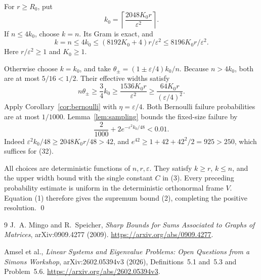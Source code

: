 \documentclass[11pt]{article}
\theoremstyle{definition}
\begin{document}
For \(r\ge R_0\), put
\[
                    k_0=\left\lceil
                            \frac{2048K_0r}{\varepsilon^2}
                          \right\rceil.                         \tag{29}
\]
If \(n\le4k_0\), choose \(k=n\). Its Gram is exact, and
\[
 k=n\le4k_0\le(8192K_0+4)r/\varepsilon^2
                         \le8196K_0r/\varepsilon^2.             \tag{30}
\]
Here \(r/\varepsilon^2\ge1\) and \(K_0\ge1\).

Otherwise choose \(k=k_0\), and take
\(\theta_\pm=(1\pm\varepsilon/4)k_0/n\).
Because \(n>4k_0\), both are at most \(5/16<1/2\).
Their effective widths satisfy
\[
 n\theta_\pm\ge\frac34 k_0
 \ge\frac{1536K_0r}{\varepsilon^2}
 \ge\frac{64K_0r}{(\varepsilon/4)^2}.                             \tag{31}
\]
Apply Corollary~\ref{cor:bernoulli} with \(\eta=\varepsilon/4\).
Both Bernoulli failure probabilities are at most \(1/1000\).
Lemma~\ref{lem:sampling} bounds the fixed-size failure by
\[
             \frac2{1000}+2e^{-\varepsilon^2k_0/48}<0.01.        \tag{32}
\]
Indeed \(\varepsilon^2k_0/48\ge2048K_0r/48>42\), and
\(e^{42}\ge1+42+42^2/2=925>250\), which suffices for (32).

All choices are deterministic functions of \(n,r,\varepsilon\).
They satisfy \(k\ge r\), \(k\le n\), and the upper width bound with
the single constant \(C\) in (3). Every preceding probability estimate
is uniform in the deterministic orthonormal frame \(V\).
Equation (1) therefore gives the supremum bound (2), completing
the positive resolution. \qed

\begin{thebibliography}{9}
J.~A. Mingo and R.~Speicher,
\emph{Sharp Bounds for Sums Associated to Graphs of Matrices},
arXiv:0909.4277 (2009).
\url{https://arxiv.org/abs/0909.4277}.

Amsel et al.,
\emph{Linear Systems and Eigenvalue Problems:
Open Questions from a Simons Workshop},
arXiv:2602.05394v3 (2026), Definitions~5.1 and~5.3 and Problem~5.6.
\url{https://arxiv.org/abs/2602.05394v3}.
\end{thebibliography}
\end{document}
